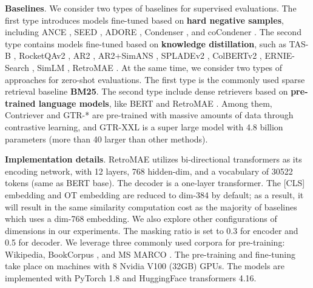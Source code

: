 \documentclass[11pt,a4paper]{article}
\begin{document}
\textbf{Baselines}. We consider two types of baselines for supervised evaluations. The first type introduces models fine-tuned based on \textbf{hard negative samples}, including ANCE \cite{xiong2020approximate}, SEED \cite{lu2021less}, ADORE \cite{zhan2021optimizing}, Condenser \cite{gao2021condenser}, and coCondener \cite{gao2021unsupervised}. The second type contains models fine-tuned based on \textbf{knowledge distillation}, such as TAS-B \cite{hofstatter2021efficiently}, RocketQAv2 \cite{ren2021rocketqav2}, AR2 \cite{zhang2021adversarial}, AR2+SimANS \cite{zhou2022simans}, SPLADEv2 \cite{formal2021splade}, ColBERTv2 \cite{santhanam2021colbertv2}, ERNIE-Search \cite{lu2022ernie}, SimLM \cite{wang2022simlm}, RetroMAE \cite{liu2022retromae}. At the same time, we consider two types of approaches for zero-shot evaluations. The first type is the commonly used sparse retrieval baseline \textbf{BM25}. The second type include dense retrievers based on \textbf{pre-trained language models}, like BERT \cite{Devlin2019BERT} and RetroMAE \cite{liu2022retromae}. Among them, Contriever \cite{izacard2021towards} and GTR-* \cite{ni2021large} are pre-trained with massive amounts of data through contrastive learning, and GTR-XXL is a super large model with 4.8 billion parameters (more than 40 larger than other methods). 




\textbf{Implementation details}. RetroMAE utilizes bi-directional transformers as its encoding network, with 12 layers, 768 hidden-dim, and a vocabulary of 30522 tokens (same as BERT base). The decoder is a one-layer transformer. The [CLS] embedding and OT embedding are reduced to dim-384 by default; as a result, it will result in the same similarity computation cost as the majority of baselines which uses a dim-768 embedding. We also explore other configurations of dimensions in our experiments. The masking ratio is set to 0.3 for encoder and 0.5 for decoder. We leverage three commonly used corpora for pre-training: Wikipedia, BookCorpus \cite{Devlin2019BERT}, and MS MARCO \cite{nguyen2016ms}. The pre-training and fine-tuning take place on machines with 8 Nvidia V100 (32GB) GPUs. The models are implemented with PyTorch 1.8 and HuggingFace transformers 4.16. 
\end{document}
